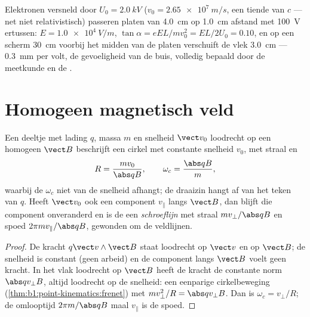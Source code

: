 \begin{example}[De oscilloscoopbuis]\label{ex:b1:charged-particles:crt}
Elektronen versneld door $U_0 = \qty{2.0}{kV}$ ($v_0 = \qty{2.65e7}{m/s}$,
een tiende van $c$ --- net niet relativistisch) passeren platen van \qty{4.0}{cm}
op \qty{1.0}{cm} afstand met \qty{100}{V} ertussen: $E = \qty{1.0e4}{V/m}$,
$\tan\alpha = eEL/mv_0^2 = EL/2U_0 = 0.10$, en op een scherm \qty{30}{cm}
voorbij het midden van de platen verschuift de vlek \qty{3.0}{cm} --- \qty{0.3}{mm}
per volt, de gevoeligheid van de buis, volledig bepaald door de meetkunde en de
.
\end{example}

\section{Homogeen magnetisch veld}

\begin{theorem}\label{thm:b1:charged-particles:bfield}
Een deeltje met lading $q$, massa $m$ en snelheid $\vect v_0$ loodrecht op
een homogeen $\vect B$ beschrijft een cirkel met constante snelheid $v_0$, met straal
en 
\[
R = \frac{mv_0}{\abs q B}, \qquad \omega_c = \frac{\abs q B}{m},
\]
waarbij de \emph{} $\omega_c$ niet van de snelheid afhangt;
de draaizin hangt af van het teken van $q$. Heeft $\vect v_0$ ook
een component $v_\parallel$ langs $\vect B$, dan blijft die component onveranderd en
is de  een \emph{schroeflijn} met straal $mv_\perp/\abs qB$ en spoed
$2\pi mv_\parallel/\abs qB$, gewonden om de veldlijnen.
\end{theorem}

\begin{proof}
De kracht $q\vect v\wedge\vect B$ staat loodrecht op $\vect v$ en op $\vect B$;
de snelheid is constant (geen arbeid) en de component langs $\vect B$ voelt geen
kracht. In het vlak loodrecht op $\vect B$ heeft de kracht de constante
norm $\abs qv_\perp B$, altijd loodrecht op de snelheid: een eenparige
cirkelbeweging (\cref{thm:b1:point-kinematics:frenet}) met $mv_\perp^2/R =
\abs qv_\perp B$. Dan is $\omega_c = v_\perp/R$; de omlooptijd $2\pi m/\abs qB$ maal
$v_\parallel$ is de spoed.
\end{proof}

